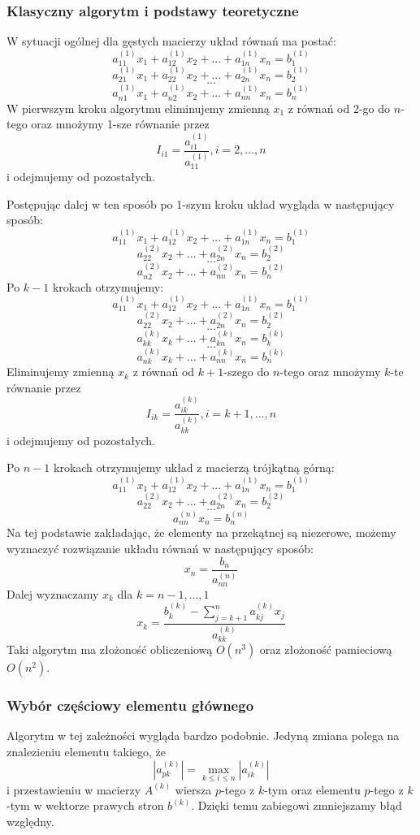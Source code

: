 \documentclass{article}
\begin{document}
\begin{itemize}
\subsubsection*{Klasyczny algorytm i podstawy teoretyczne}
W sytuacji ogólnej dla gęstych macierzy układ równań ma postać:
\[ a_{11}^{(1)}x_1 + a_{12}^{(1)}x_2 + ... + a_{1n}^{(1)}x_n = b_1^{(1)} \]
\[ a_{21}^{(1)}x_1 + a_{22}^{(1)}x_2 + ... + a_{2n}^{(1)}x_n = b_2^{(1)} \]
\[ ... \]
\[ a_{n1}^{(1)}x_1 + a_{n2}^{(1)}x_2 + ... + a_{nn}^{(1)}x_n = b_n^{(1)} \]
W pierwszym kroku algorytmu eliminujemy zmienną $x_1$ z równań od 2-go do $n$-tego oraz mnożymy 1-sze równanie przez
\[ I_{i1} = \frac{a_{i1}^{(1)}}{a_{11}^{(1)}}, i = 2,...,n \]
i odejmujemy od pozostałych.
\par
Postępując dalej w ten sposób po 1-szym kroku układ wygląda w następujący sposób:
\[ a_{11}^{(1)}x_1 + a_{12}^{(1)}x_2 + ... + a_{1n}^{(1)}x_n = b_1^{(1)}  \]
\[ a_{22}^{(2)}x_2 + ... + a_{2n}^{(2)}x_n = b_2^{(2)} \]
\[ ... \]
\[ a_{n2}^{(2)}x_2 + ... + a_{nn}^{(2)}x_n = b_n^{(2)} \]
Po $k-1$ krokach otrzymujemy:
\[ a_{11}^{(1)}x_1 + a_{12}^{(1)}x_2 + ... + a_{1n}^{(1)}x_n = b_1^{(1)} \]
\[ a_{22}^{(2)}x_2 + ... + a_{2n}^{(2)}x_n = b_2^{(2)} \]
\[ ... \]
\[ a_{kk}^{(k)}x_k + ... + a_{kn}^{(k)}x_n = b_k^{(k)} \]
\[ ... \]
\[ a_{nk}^{(k)}x_{k} + ... + a_{nn}^{(k)}x_n = b_n^{(k)} \]
Eliminujemy zmienną $x_k$ z równań od $k+1$-szego do $n$-tego oraz mnożymy $k$-te równanie przez
\[ I_{ik} = \frac{a_{ik}^{(k)}}{a_{kk}^{(k)}}, i = k+1,...,n \]
i odejmujemy od pozostałych.
\par
Po $n-1$ krokach otrzymujemy układ z macierzą trójkątną górną:
\[ a_{11}^{(1)}x_1 + a_{12}^{(1)}x_2 + ... + a_{1n}^{(1)}x_n = b_1^{(1)} \]
\[ a_{22}^{(2)}x_2 + ... + a_{2n}^{(2)}x_n = b_2^{(2)} \]
\[ ... \]
\[ a_{nn}^{(n)}x_n = b_n^{(n)} \]
Na tej podstawie zakładając, że elementy na przekątnej są niezerowe, możemy wyznaczyć rozwiązanie układu równań w następujący sposób:
\[ x_n = \frac{b_n}{a_{nn}^{(n)}} \]
Dalej wyznaczamy $x_k$ dla $k=n-1,...,1$
\[ x_k = \frac{b_k^{(k)} - \sum_{j=k+1}^{n} a_{kj}^{(k)}x_j}{a_{kk}^{(k)}} \]
Taki algorytm ma złożoność obliczeniową $O(n^3)$ oraz złożoność pamieciową $O(n^2)$.
\subsubsection*{Wybór częściowy elementu głównego}
Algorytm w tej zależności wygląda bardzo podobnie. Jedyną zmiana polega na znalezieniu elementu takiego, że
\[ |a_{pk}^{(k)}| = \max_{k \leq i \leq n} |a_{ik}^{(k)}| \]
i przestawieniu w macierzy $A^{(k)}$ wiersza $p$-tego z $k$-tym oraz elementu $p$-tego z $k$-tym w wektorze prawych stron $b^{(k)}$. Dzięki temu zabiegowi zmniejszamy błąd względny.

\end{itemize}
\end{document}
